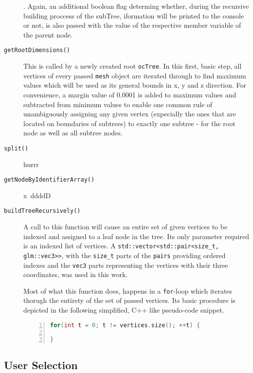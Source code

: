 \begin{description}
\begin{enumerate*}
	\end{enumerate*}.
	Again, an additional boolean flag determing whether, during the recursive building proccess of the subTree, iformation will be printed to the console or not, is also passed with the value of the respective member variable of the parent node.
	\item[\texttt{getRootDimensions()}] This is called by a newly created root \texttt{ocTree}. In this first, basic step, all vertices of every passed \texttt{mesh} object are iterated through to find maximum values which will be used as its general bounds in x, y and z direction. For convenience, a margin value of 0.0001 is added to maximum values and subtracted from minimum values to enable one common rule of unambiguously assigning any given vertex (expecially the ones that are located on boundaries of subtrees) to exactly one subtree - for the root node as well as all subtree nodes.
	\item[\texttt{split()}] hurrr
	\item[\texttt{getNodeByIdentifierArray()}] x~ddddD
	\item[\texttt{buildTreeRecursively()}] A call to this function will cause an entire set of given vertices to be indexed and assigned to a leaf node in the tree. Its only parameter required is an indexed list of vertices. A \texttt{std::vector<std::pair<size\_t, glm::vec3>>}, with the \texttt{size\_t} parts of the \texttt{pairs} providing ordered indexes and the \texttt{vec3} parts representing the vertices with their three coordinates, was used in this work. 

	Most of what this function does, happens in a \texttt{for}-loop which iterates thorugh the entirety of the set of passed vertices. Its basic procedure is depicted in the following simplified, C++ like pseudo-code snippet.

\begin{lstlisting}[language=C++,numberstyle=\zebra{black!5}{white}{},numbers=left,xleftmargin=2em]
for(int t = 0; t != vertices.size(); ++t) {
	
}
\end{lstlisting}

\end{description}
 


\subsection{User Selection}
\label{sec:user_selection}

